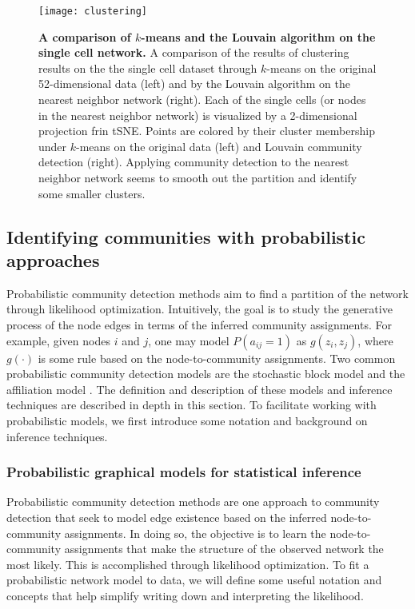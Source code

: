  \begin{figure}
\begin{center}
\texttt{[image: clustering]}
\caption{{\bf A comparison of $k$-means and the Louvain algorithm on the single cell network.} A comparison of the results of clustering results on the the single cell dataset through $k$-means on the original 52-dimensional data (left) and by the Louvain algorithm on the nearest neighbor network (right). Each of the single cells (or nodes in the nearest neighbor network) is visualized by a 2-dimensional projection frin tSNE. Points are colored by their cluster membership under $k$-means on the original data (left) and Louvain community detection (right). Applying community detection to the nearest neighbor network seems to smooth out the partition and identify some smaller clusters. }
\label{fig:clustering}
\end{center}
\end{figure}

\subsection{Identifying communities with probabilistic approaches}

\indent Probabilistic community detection methods aim to find a partition of the network through likelihood optimization. Intuitively, the goal is to study the generative process of the node edges in terms of the inferred community assignments. For example, given nodes $i$ and $j$, one may model $P(a_{ij}=1)$ as $g(z_{i},z_{j})$, where $g(\cdot)$ is some rule based on the node-to-community assignments. Two common probabilistic community detection models are the stochastic block model \cite{originalSBM} and the affiliation model \cite{affil}. The definition and description of these models and inference techniques are described in depth in this section. To facilitate working with probabilistic models, we first introduce some notation and background on inference techniques. 

\subsubsection{Probabilistic graphical models for statistical inference}
\label{pgm}
Probabilistic community detection methods are one approach to community detection that seek to model edge existence based on the inferred node-to-community assignments. In doing so, the objective is to learn the node-to-community assignments that make the structure of the observed network the most likely. This is accomplished through likelihood optimization. To fit a probabilistic network model to data, we will define some useful notation and concepts that help simplify writing down and interpreting the likelihood. 

